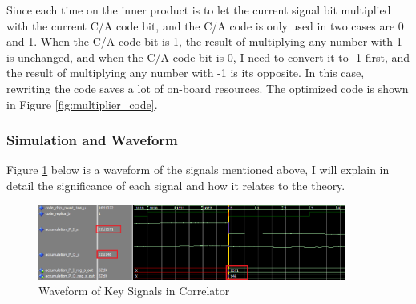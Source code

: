 Since each time on the inner product is to let the current signal bit multiplied with the current C/A code bit, and the C/A code is only used in two cases are 0 and 1. When the C/A code bit is 1, the result of multiplying any number with 1 is unchanged, and when the C/A code bit is 0, I need to convert it to -1 first, and the result of multiplying any number with -1 is its opposite. In this case, rewriting the code saves a lot of on-board resources. The optimized code is shown in Figure \ref{fig:multiplier_code}.


% 

\subsubsection{Simulation and Waveform}
Figure \ref{fig:correlator_wave} below is a waveform of the signals mentioned above, I will explain in detail the significance of each signal and how it relates to the theory.

\begin{figure}[!htbp]
    \centering
    \includegraphics[width=0.9\textwidth]{_IMAGES/correlator_wave.png}
    \caption{Waveform of Key Signals in Correlator}
    \label{fig:correlator_wave}
\end{figure}

